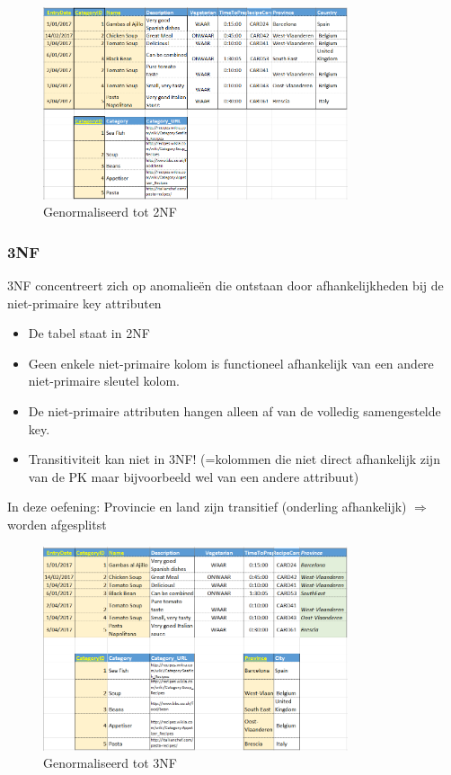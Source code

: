 \documentclass{article}
\begin{document}
\begin{figure}[H]
    \centering
    \includegraphics[width=0.8\textwidth]{2NF.png}
    \caption{Genormaliseerd tot 2NF}
\end{figure}

\subsubsection{3NF}
3NF concentreert zich op anomalieën die ontstaan door afhankelijkheden bij de niet-primaire key attributen
\begin{itemize}
    \item De tabel staat in 2NF
    \item Geen enkele niet-primaire kolom is functioneel afhankelijk van een andere niet-primaire sleutel kolom. 
    \item De niet-primaire attributen hangen alleen af van de volledig samengestelde key.
    \item Transitiviteit kan niet in 3NF! (=kolommen die niet direct afhankelijk zijn van de PK maar bijvoorbeeld wel van een andere attribuut)
\end{itemize}

In deze oefening: Provincie en land zijn transitief (onderling afhankelijk) $\Rightarrow$ worden afgesplitst

\begin{figure}[H]
    \centering
    \includegraphics[width=0.8\textwidth]{3NF.png}
    \caption{Genormaliseerd tot 3NF}
\end{figure}
\end{document}
